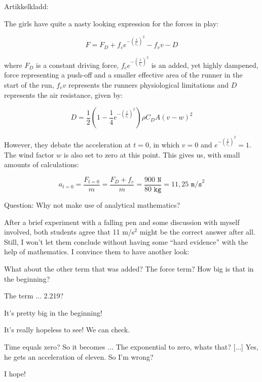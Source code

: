Artikkelkladd:

The girls have quite a nasty looking expression for the forces in play:

\begin{equation}
F = F_D + f_c e^{-(\frac{t}{t_c})^2} - f_v v - D
\end{equation}

where $F_D$ is a constant driving force, $f_c e^{-(\frac{t}{t_c})^2}$ is an added, yet highly dampened, force representing a push-off and a smaller effective area of the runner in the start of the run, $f_v v$ represents the runners physiological limitations and $D$ represents the air resistance, given by: 

\begin{equation}
D = \frac{1}{2}(1-\frac{1}{4}e^{-(\frac{t}{t_c})^2})\rho C_D A(v-w)^2
\end{equation}

However, they debate the acceleration at $t=0$, in which $v=0$ and $e^{-(\frac{t}{t_c})^2}=1$. The wind factor $w$ is also set to zero at this point. This gives us, with small amounts of calculations: 

\begin{equation}
a_{t=0} = \frac{F_{t=0}}{m} = \frac{F_D + f_c}{m} = \frac{900\texttt{ N}}{80\texttt{ kg}} = 11,25 \texttt{ m/s}^2
\end{equation}

Question: Why not make use of analytical mathematics?

After a brief experiment with a falling pen and some discussion with myself involved, both students agree that 11 m/s$^2$ might be the correct answer after all. Still, I won't let them conclude without having some ``hard evidence'' with the help of mathematics. I convince them to have another look:

\begin{description}
\small
\item[I] What about the other term that was added? The force term? How big is that in the beginning? 
\item[J1] The term ... 2.219? 
\item[J2] It's pretty big in the beginning! 
\item[J1] It's really hopeless to see! We can check. 
\item[] [...]
\item[J1] Time equals zero? So it becomes ... The exponential to zero, whats that? [...] Yes, he gets an acceleration of eleven. So I'm wrong?
\item[J2] I hope! 
\end{description}